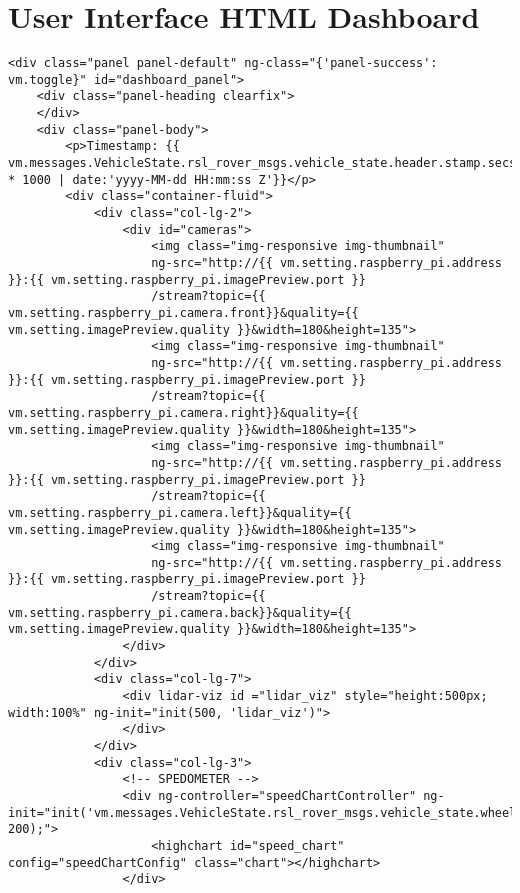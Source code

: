 \section*{User Interface HTML Dashboard}
\begin{lstlisting}[breaklines=true,basicstyle=\tiny]
<div class="panel panel-default" ng-class="{'panel-success': vm.toggle}" id="dashboard_panel">
    <div class="panel-heading clearfix">
    </div>
    <div class="panel-body">
        <p>Timestamp: {{ vm.messages.VehicleState.rsl_rover_msgs.vehicle_state.header.stamp.secs * 1000 | date:'yyyy-MM-dd HH:mm:ss Z'}}</p>
        <div class="container-fluid">
            <div class="col-lg-2">
                <div id="cameras">
                    <img class="img-responsive img-thumbnail" 
                    ng-src="http://{{ vm.setting.raspberry_pi.address }}:{{ vm.setting.raspberry_pi.imagePreview.port }}
                    /stream?topic={{ vm.setting.raspberry_pi.camera.front}}&quality={{ vm.setting.imagePreview.quality }}&width=180&height=135">
                    <img class="img-responsive img-thumbnail" 
                    ng-src="http://{{ vm.setting.raspberry_pi.address }}:{{ vm.setting.raspberry_pi.imagePreview.port }}
                    /stream?topic={{ vm.setting.raspberry_pi.camera.right}}&quality={{ vm.setting.imagePreview.quality }}&width=180&height=135">
                    <img class="img-responsive img-thumbnail" 
                    ng-src="http://{{ vm.setting.raspberry_pi.address }}:{{ vm.setting.raspberry_pi.imagePreview.port }}
                    /stream?topic={{ vm.setting.raspberry_pi.camera.left}}&quality={{ vm.setting.imagePreview.quality }}&width=180&height=135">
                    <img class="img-responsive img-thumbnail" 
                    ng-src="http://{{ vm.setting.raspberry_pi.address }}:{{ vm.setting.raspberry_pi.imagePreview.port }}
                    /stream?topic={{ vm.setting.raspberry_pi.camera.back}}&quality={{ vm.setting.imagePreview.quality }}&width=180&height=135">
                </div>
            </div>
            <div class="col-lg-7">
                <div lidar-viz id ="lidar_viz" style="height:500px; width:100%" ng-init="init(500, 'lidar_viz')">
                </div>
            </div>
            <div class="col-lg-3">
                <!-- SPEDOMETER -->
                <div ng-controller="speedChartController" ng-init="init('vm.messages.VehicleState.rsl_rover_msgs.vehicle_state.wheel_speed', 200);">
                    <highchart id="speed_chart" config="speedChartConfig" class="chart"></highchart>
                </div>

\end{lstlisting}
